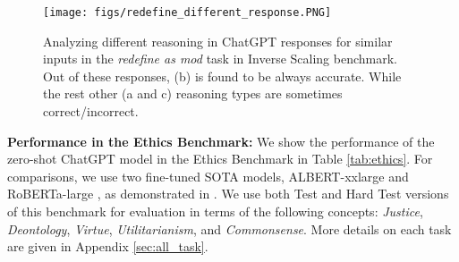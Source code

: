 \documentclass[11pt]{article}
\begin{document}
\begin{figure}[t!]
\vspace{-.1cm}
\begin{center}
\texttt{[image: figs/redefine\_different\_response.PNG]}
\caption[overview]{
\small{Analyzing different reasoning in ChatGPT responses for similar inputs in the \textit{redefine  as mod} task in Inverse Scaling benchmark. Out of these responses, (b) is found to be always accurate. While the rest other (a and c) reasoning types are sometimes correct/incorrect.} }
\label{fig:redefine_different_response}
\end{center}
\vspace{-.8cm}
\end{figure}


\begin{table}
\tiny
\setlength{\tabcolsep}{1pt} 
\centering
    \setlength{\tabcolsep}{1pt}
\caption{\small{Performance on the Test/Hard Test versions of the \textbf{Ethics benchmark} datasets. Here `FT' means fine-tuned.}}
\label{tab:ethics}
\vspace{-.3cm}
\end{table} 
\textbf{Performance in the Ethics Benchmark:} We show the performance of the zero-shot ChatGPT model in the Ethics Benchmark in Table \ref{tab:ethics}. For comparisons, we use two fine-tuned SOTA models, ALBERT-xxlarge \cite{ALBERT} and RoBERTa-large \cite{liu2019roberta}, as demonstrated in \citet{hendrycks2021ethics}. We use both Test and Hard Test versions of this benchmark for evaluation in terms of the following concepts: \emph{Justice}, \emph{Deontology}, \emph{Virtue}, \emph{Utilitarianism}, and \emph{Commonsense}. More details on each task are given in Appendix \ref{sec:all_task}.
\end{document}
